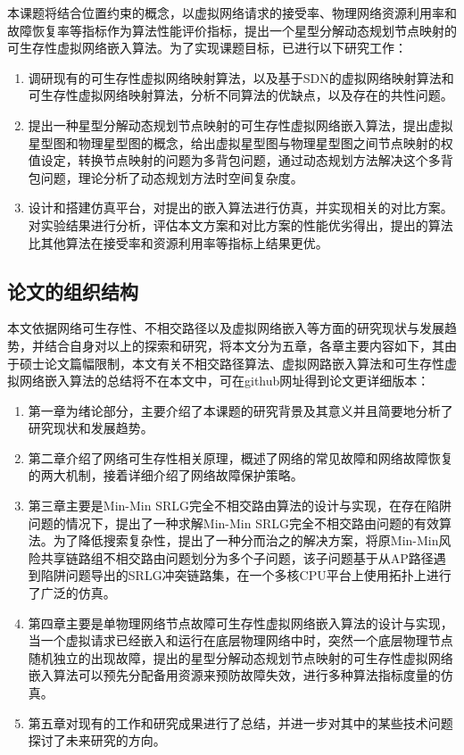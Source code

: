 本课题将结合位置约束的概念，以虚拟网络请求的接受率、物理网络资源利用率和故障恢复率等指标作为算法性能评价指标，提出一个星型分解动态规划节点映射的可生存性虚拟网络嵌入算法。为了实现课题目标，已进行以下研究工作：
\begin{enumerate}
  \item 调研现有的可生存性虚拟网络映射算法，以及基于SDN的虚拟网络映射算法和可生存性虚拟网络映射算法，分析不同算法的优缺点，以及存在的共性问题。
  \item 提出一种星型分解动态规划节点映射的可生存性虚拟网络嵌入算法，提出虚拟星型图和物理星型图的概念，给出虚拟星型图与物理星型图之间节点映射的权值设定，转换节点映射的问题为多背包问题，通过动态规划方法解决这个多背包问题，理论分析了动态规划方法时空间复杂度。
  \item 设计和搭建仿真平台，对提出的嵌入算法进行仿真，并实现相关的对比方案。对实验结果进行分析，评估本文方案和对比方案的性能优劣得出，提出的算法比其他算法在接受率和资源利用率等指标上结果更优。
\end{enumerate}

\subsection{论文的组织结构}
本文依据网络可生存性、不相交路径以及虚拟网络嵌入等方面的研究现状与发展趋势，并结合自身对以上的探索和研究，将本文分为五章，各章主要内容如下，其由于硕士论文篇幅限制，本文有关不相交路径算法、虚拟网路嵌入算法和可生存性虚拟网络嵌入算法的总结将不在本文中，可在github网址\cite{Thesis}得到论文更详细版本：
\begin{enumerate}
  \item 第一章为绪论部分，主要介绍了本课题的研究背景及其意义并且简要地分析了研究现状和发展趋势。
  \item 第二章介绍了网络可生存性相关原理，概述了网络的常见故障和网络故障恢复的两大机制，接着详细介绍了网络故障保护策略。
  \item 第三章主要是Min-Min SRLG完全不相交路由算法的设计与实现，在存在陷阱问题的情况下，提出了一种求解Min-Min SRLG完全不相交路由问题的有效算法。为了降低搜索复杂性，提出了一种分而治之的解决方案，将原Min-Min风险共享链路组不相交路由问题划分为多个子问题，该子问题基于从AP路径遇到陷阱问题导出的SRLG冲突链路集，在一个多核CPU平台上使用拓扑上进行了广泛的仿真。
  \item 第四章主要是单物理网络节点故障可生存性虚拟网络嵌入算法的设计与实现，当一个虚拟请求已经嵌入和运行在底层物理网络中时，突然一个底层物理节点随机独立的出现故障，提出的星型分解动态规划节点映射的可生存性虚拟网络嵌入算法可以预先分配备用资源来预防故障失效，进行多种算法指标度量的仿真。
  \item 第五章对现有的工作和研究成果进行了总结，并进一步对其中的某些技术问题探讨了未来研究的方向。
\end{enumerate}
